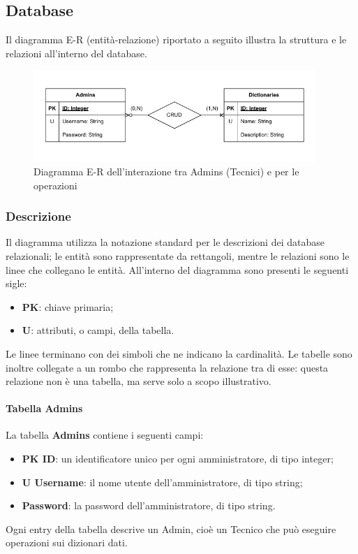 \subsection{Database}

\par Il diagramma E-R (entità-relazione) riportato a seguito illustra la struttura e le relazioni all'interno del database.

\begin{figure}[H]
    \centering
    \includegraphics[width=0.95\textwidth]{assets/Database/DiagrammiDB.png}
    \caption{Diagramma E-R dell'interazione tra Admins (Tecnici) e  per le operazioni }
\end{figure}

\subsubsection{Descrizione}
\par Il diagramma utilizza la notazione standard per le descrizioni dei database relazionali; le entità sono rappresentate da rettangoli, mentre le relazioni sono le linee che collegano le entità. All'interno del diagramma sono presenti le seguenti sigle:
\begin{itemize}
    \item \textbf{PK}: chiave primaria;
    \item \textbf{U}: attributi, o campi, della tabella.
\end{itemize}

\par Le linee terminano con dei simboli che ne indicano la cardinalità. Le tabelle sono inoltre collegate a un rombo che rappresenta la relazione tra di esse: questa relazione non è una tabella, ma serve solo a scopo illustrativo.

\paragraph{Tabella Admins}
\par La tabella \textbf{Admins} contiene i seguenti campi:
\begin{itemize}
    \item \textbf{PK ID}: un identificatore unico per ogni amministratore, di tipo integer;
    \item \textbf{U Username}: il nome utente dell'amministratore, di tipo string;
    \item \textbf{Password}: la password dell'amministratore, di tipo string.
\end{itemize}
\par Ogni entry della tabella descrive un Admin, cioè un Tecnico che può eseguire operazioni  sui dizionari dati.

